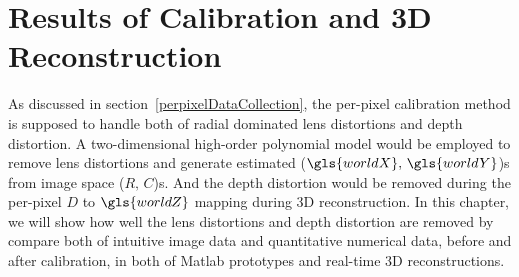 \chapter{Results of Calibration and \gls{3D} Reconstruction} %
\label{chapterCaliResultsReconstruction} %
As discussed in section~\ref{perpixelDataCollection}, the per-pixel calibration method is supposed to handle both of radial dominated lens distortions and depth distortion. A two-dimensional high-order polynomial model would be employed to remove lens distortions and generate estimated (\(\gls{worldX},\, \gls{worldY}\))s from image space (\(R, \, C\))s. And the depth distortion would be removed during the per-pixel \(D\) to \(\gls{worldZ}\) mapping during 3D reconstruction. In this chapter, we will show how well the lens distortions and depth distortion are removed by compare both of intuitive image data and quantitative numerical data, before and after calibration, in both of Matlab prototypes and real-time 3D reconstructions. 
